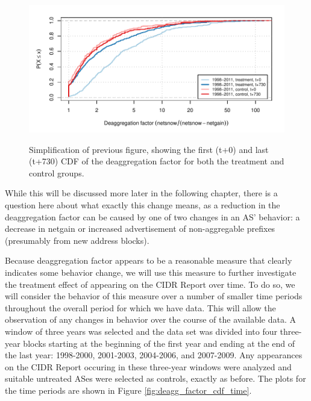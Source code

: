 \begin{figure}[H]
\begin{centering}
\begin{singlespace}
    \includegraphics[width=6in]
        {figures/behavior-deagg_factor-1997_2011-special_tc.pdf}
    \vspace{-2em}\\
    \caption{Simplification of previous figure, showing the first (t+0) and
    last (t+730) CDF of the deaggregation factor for both the treatment and
    control groups.}
    \label{fig:deagg_factor_cdf_simple}
\end{singlespace}
\end{centering}
\end{figure}

While this will be discussed more later in the following chapter, there is a
question here about what exactly this change means, as a reduction in the
deaggregation factor can be caused by one of two changes in an AS' behavior: a
decrease in netgain or increased advertisement of non-aggregable prefixes
(presumably from new address blocks).


Because deaggregation factor appears to be a reasonable measure that clearly
indicates some behavior change, we will use this measure to further investigate
the treatment effect of appearing on the CIDR Report over time. To do so, we
will consider the behavior of this measure over a number of smaller time
periods throughout the overall period for which we have data. This will allow
the observation of any changes in behavior over the course of the available
data. A window of three years was selected and the data set was divided into
four three-year blocks starting at the beginning of the first year and ending
at the end of the last year: 1998-2000, 2001-2003, 2004-2006, and 2007-2009.
Any appearances on the CIDR Report occuring in these three-year windows were
analyzed and suitable untreated ASes were selected as controls, exactly as
before. The plots for the time periods are shown in Figure
\ref{fig:deagg_factor_cdf_time}.

